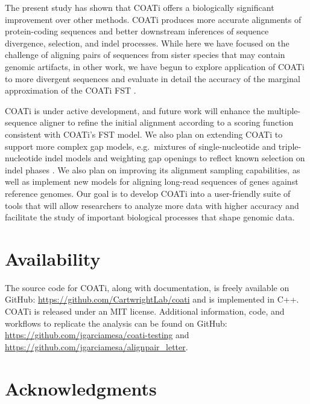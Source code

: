 \documentclass[12pt,letterpaper]{article}
\begin{document}
The present study has shown that COATi offers a biologically significant improvement over other methods. COATi produces more accurate alignments of protein-coding sequences and better downstream inferences of sequence divergence, selection, and indel processes. While here we have focused on the challenge of aligning pairs of sequences from sister species that may contain genomic artifacts, in other work, we have begun to explore application of COATi to more divergent sequences and evaluate in detail the accuracy of the marginal approximation of the COATi FST \citep{garcia2023dissertation}.

COATi is under active development, and future work will enhance the multiple-sequence aligner to refine the initial alignment according to a scoring function consistent with COATi's FST model. We also plan on extending COATi to support more complex gap models, e.g.\ mixtures of single-nucleotide and triple-nucleotide indel models and weighting gap openings to reflect known selection on indel phases \citep{zhu2022profiling}. We also plan on improving its alignment sampling capabilities, as well as implement new models for aligning long-read sequences of genes against reference genomes. Our goal is to develop COATi into a user-friendly suite of tools that will allow researchers to analyze more data with higher accuracy and facilitate the study of important biological processes that shape genomic data.

\section*{Availability}

The source code for COATi, along with documentation, is freely available on GitHub: \url{https://github.com/CartwrightLab/coati} and is implemented in C++. COATi is released under an MIT license. Additional information, code, and workflows to replicate the analysis can be found on GitHub: \url{https://github.com/jgarciamesa/coati-testing} and \url{https://github.com/jgarciamesa/alignpair_letter}.


\section*{Acknowledgments}
\end{document}
